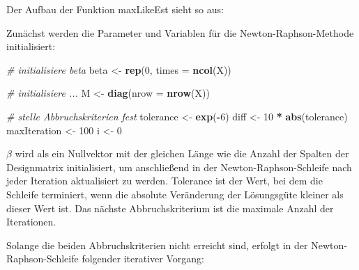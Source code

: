 \documentclass[12pt,]{article}
\newenvironment{Shaded}{\begin{snugshade}}{\end{snugshade}}
\newcommand{\KeywordTok}[1]{\textcolor[rgb]{0.13,0.29,0.53}{\textbf{#1}}}
\newcommand{\DataTypeTok}[1]{\textcolor[rgb]{0.13,0.29,0.53}{#1}}
\newcommand{\DecValTok}[1]{\textcolor[rgb]{0.00,0.00,0.81}{#1}}
\newcommand{\StringTok}[1]{\textcolor[rgb]{0.31,0.60,0.02}{#1}}
\newcommand{\CommentTok}[1]{\textcolor[rgb]{0.56,0.35,0.01}{\textit{#1}}}
\newcommand{\ControlFlowTok}[1]{\textcolor[rgb]{0.13,0.29,0.53}{\textbf{#1}}}
\newcommand{\OperatorTok}[1]{\textcolor[rgb]{0.81,0.36,0.00}{\textbf{#1}}}
\newcommand{\NormalTok}[1]{#1}
\begin{document}
Der Aufbau der Funktion maxLikeEst sieht so aus:

\begin{Shaded}
\end{Shaded}

Zunächst werden die Parameter und Variablen für die
Newton-Raphson-Methode initialisiert:

\begin{Shaded}
\begin{Highlighting}[]
\CommentTok{# initialisiere beta}
\NormalTok{beta <-}\StringTok{ }\KeywordTok{rep}\NormalTok{(}\DecValTok{0}\NormalTok{, }\DataTypeTok{times =} \KeywordTok{ncol}\NormalTok{(X))}

\CommentTok{# initialisiere ...}
\NormalTok{M <-}\StringTok{ }\KeywordTok{diag}\NormalTok{(}\DataTypeTok{nrow =} \KeywordTok{nrow}\NormalTok{(X))}

\CommentTok{# stelle Abbruchskriterien fest}
\NormalTok{tolerance <-}\StringTok{ }\KeywordTok{exp}\NormalTok{(}\OperatorTok{-}\DecValTok{6}\NormalTok{)}
\NormalTok{diff <-}\StringTok{ }\DecValTok{10} \OperatorTok{*}\StringTok{ }\KeywordTok{abs}\NormalTok{(tolerance)}
\NormalTok{maxIteration <-}\StringTok{ }\DecValTok{100}
\NormalTok{i <-}\StringTok{ }\DecValTok{0}
\end{Highlighting}
\end{Shaded}

\(\beta\) wird als ein Nullvektor mit der gleichen Länge wie die Anzahl
der Spalten der Designmatrix initialisiert, um anschließend in der
Newton-Raphson-Schleife nach jeder Iteration aktualisiert zu werden.
Tolerance ist der Wert, bei dem die Schleife terminiert, wenn die
absolute Veränderung der Lösungsgüte kleiner als dieser Wert ist. Das
nächste Abbruchskriterium ist die maximale Anzahl der Iterationen.

Solange die beiden Abbruchskriterien nicht erreicht sind, erfolgt in der
Newton-Raphson-Schleife folgender iterativer Vorgang:
\end{document}
